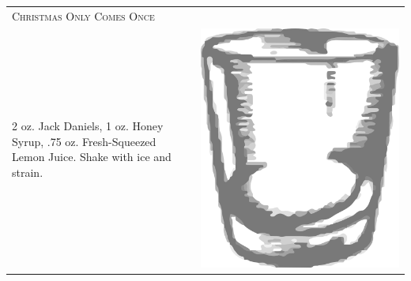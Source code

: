 \documentclass{article}
\begin{document}
\begin{tabular}{p{2in} p{0.5in}}
  \multicolumn{2}{p{3in}}{\centering\Huge\textsc{Christmas Only Comes Once}} \\ 
  
   \vspace{-0.1in}2 oz. Jack Daniels, 1 oz. Honey Syrup, .75 oz.
    Fresh-Squeezed Lemon Juice. Shake with ice and strain. &
   \vspace{-0.1in} \includegraphics{rocks_glass.png}
\end{tabular}
\end{document}
